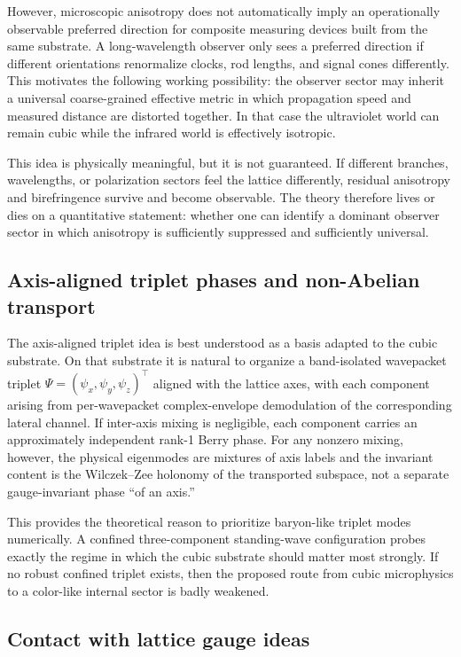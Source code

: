 However, microscopic anisotropy does not automatically imply an operationally observable preferred direction for
composite measuring devices built from the same substrate.
A long-wavelength observer only sees a preferred direction if different orientations renormalize clocks, rod lengths,
and signal cones differently.
This motivates the following working possibility: the observer sector may inherit a universal coarse-grained effective
metric in which propagation speed and measured distance are distorted together.
In that case the ultraviolet world can remain cubic while the infrared world is effectively isotropic.

This idea is physically meaningful, but it is not guaranteed.
If different branches, wavelengths, or polarization sectors feel the lattice differently, residual anisotropy and
birefringence survive and become observable.
The theory therefore lives or dies on a quantitative statement: whether one can identify a dominant observer sector in
which anisotropy is sufficiently suppressed and sufficiently universal.

\subsection{Axis-aligned triplet phases and non-Abelian transport}
\label{subsec:discussion-axis-triplet}

The axis-aligned triplet idea is best understood as a basis adapted to the cubic substrate.
On that substrate it is natural to organize a band-isolated wavepacket triplet
$\Psi=(\psi_x,\psi_y,\psi_z)^\top$ aligned with the lattice axes, with each component arising from per-wavepacket
complex-envelope demodulation of the corresponding lateral channel.
If inter-axis mixing is negligible, each component carries an approximately independent rank-1 Berry phase.
For any nonzero mixing, however, the physical eigenmodes are mixtures of axis labels and the invariant content is the
Wilczek--Zee holonomy of the transported subspace, not a separate gauge-invariant phase ``of an axis.''

This provides the theoretical reason to prioritize baryon-like triplet modes numerically.
A confined three-component standing-wave configuration probes exactly the regime in which the cubic substrate should
matter most strongly.
If no robust confined triplet exists, then the proposed route from cubic microphysics to a color-like internal sector is
badly weakened.

\subsection{Contact with lattice gauge ideas}
\label{subsec:discussion-lqcd}

